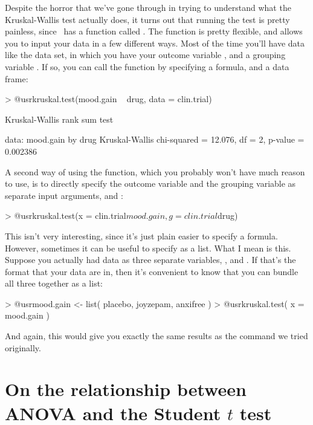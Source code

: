 
Despite the horror that we've gone through in trying to understand what the Kruskal-Wallis test actually does, it turns out that running the test is pretty painless, since \R\ has a function called . The function is pretty flexible, and allows you to input your data in a few different ways. Most of the time you'll have data like the  data set, in which you have your outcome variable , and a grouping variable . If so, you can call the  function by specifying a formula, and a data frame:
\begin{rblock1}
> @usr{kruskal.test(mood.gain ~ drug, data = clin.trial)}

	Kruskal-Wallis rank sum test

data:  mood.gain by drug 
Kruskal-Wallis chi-squared = 12.076, df = 2, p-value = 0.002386
\end{rblock1}
A second way of using the  function, which you probably won't have much reason to use, is to directly specify the outcome variable and the grouping variable as separate input arguments,  and :
\begin{rblock1}
> @usr{kruskal.test(x = clin.trial$mood.gain, g = clin.trial$drug)}
\end{rblock1}
This isn't very interesting, since it's just plain easier to specify a formula. However, sometimes it can be useful to specify  as a list. What I mean is this. Suppose you actually had data as three separate variables, ,  and . If that's the format that your data are in, then it's convenient to know that you can bundle all three together as a list:
\begin{rblock1}
> @usr{mood.gain <- list( placebo, joyzepam, anxifree )}
> @usr{kruskal.test( x = mood.gain )}
\end{rblock1}
And again, this would give you exactly the same results as the command we tried originally.


\section{On the relationship between ANOVA and the Student $t$ test~\label{sec:anovaandt}}

